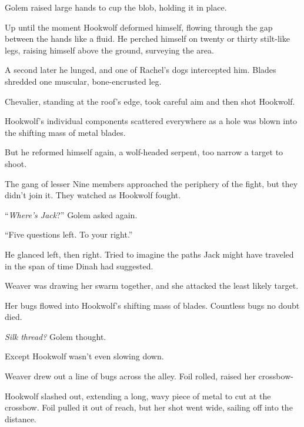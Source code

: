 Golem raised large hands to cup the blob, holding it in place.



Up until the moment Hookwolf deformed himself, flowing through the gap between the hands like a fluid.  He perched himself on twenty or thirty stilt-like legs, raising himself above the ground, surveying the area.



A second later he lunged, and one of Rachel's dogs intercepted him.  Blades shredded one muscular, bone-encrusted leg.



Chevalier, standing at the roof's edge, took careful aim and then shot Hookwolf.



Hookwolf's individual components scattered everywhere as a hole was blown into the shifting mass of metal blades.



But he reformed himself again, a wolf-headed serpent, too narrow a target to shoot.



The gang of lesser Nine members approached the periphery of the fight, but they didn't join it.  They watched as Hookwolf fought.



``\emph{Where's Jack}?''  Golem asked again.



``Five questions left.  To your right.''



He glanced left, then right.  Tried to imagine the paths Jack might have traveled in the span of time Dinah had suggested.



Weaver was drawing her swarm together, and she attacked the least likely target.



Her bugs flowed into Hookwolf's shifting mass of blades.  Countless bugs no doubt died.



\emph{Silk thread?}  Golem thought.



Except Hookwolf wasn't even slowing down.



Weaver drew out a line of bugs across the alley.  Foil rolled, raised her crossbow-



Hookwolf slashed out, extending a long, wavy piece of metal to cut at the crossbow.  Foil pulled it out of reach, but her shot went wide, sailing off into the distance.



